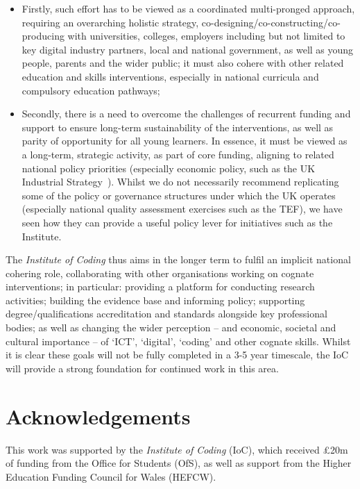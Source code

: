 \documentclass[conference]{IEEEtran}
\begin{document}
\begin{itemize}
\item Firstly, such effort has to be viewed as a coordinated
multi-pronged approach, requiring an overarching holistic strategy,
co-designing/co-constructing/co-producing with universities, colleges,
employers including but not limited to key digital industry partners,
local and national government, as well as young people, parents and
the wider public; it must also cohere with other related education and
skills interventions, especially in national curricula and compulsory
education pathways;

\item Secondly, there is a need to overcome the challenges of
recurrent funding and support to ensure long-term sustainability of
the interventions, as well as parity of opportunity for all
young learners. In essence, it must be viewed as a long-term,
strategic activity, as part of core funding, aligning to related
national policy priorities (especially economic policy, such as the UK
Industrial Strategy~\cite{ukis:2017}). Whilst we do not necessarily
recommend replicating some of the policy or governance structures
under which the UK operates (especially national quality assessment
exercises such as the TEF), we have seen how they can provide a useful
policy lever for initiatives such as the Institute.
\end{itemize}

The {\emph{Institute of Coding}} thus aims in the longer term to fulfil an
implicit national cohering role, collaborating with other
organisations working on cognate interventions; in particular:
providing a platform for conducting research activities; building the
evidence base and informing policy; supporting degree/qualifications
accreditation and standards alongside key professional bodies; as well
as changing the wider perception -- and economic, societal and
cultural importance -- of `ICT', `digital', `coding' and other cognate
skills. Whilst it is clear these goals will not be fully completed in
a 3-5 year timescale, the IoC will provide a strong
foundation for continued work in this area.

\section*{Acknowledgements}

This work was supported by the {\emph{Institute of Coding}} (IoC),
which received \pounds20m of funding from the Office for Students
(OfS), as well as support from the Higher Education Funding Council
for Wales (HEFCW).
\end{document}
